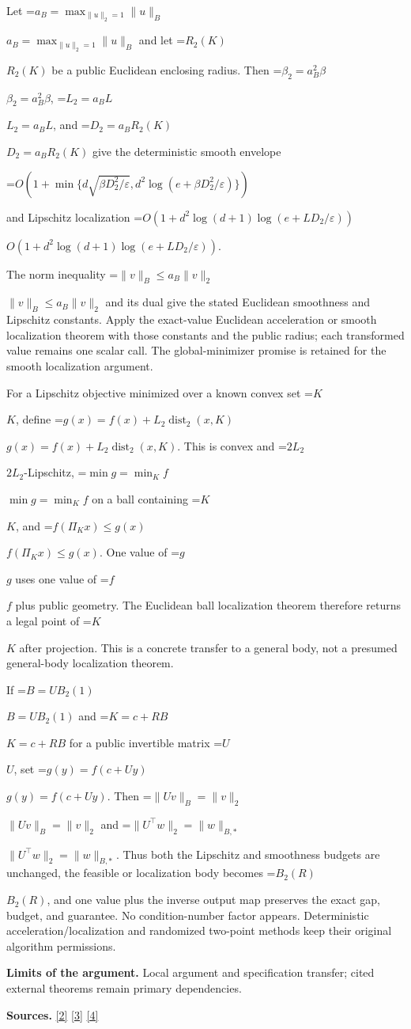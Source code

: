 \documentclass[10pt,a4paper]{article}
\newcommand{\AtlasMath}[1]{\par\begingroup\centering\setbox0=\hbox{$\displaystyle #1$}\ifdim\wd0>1.4\linewidth\typeout{ATLAS WIDE FORMULA: \the\wd0}\fi\ifdim\wd0>\linewidth\resizebox{\linewidth}{!}{\box0}\else\box0\fi\par\endgroup}
\newcommand{\AtlasInlineMath}[1]{\begingroup\setbox0=\hbox{$#1$}\ifdim\wd0>.4\linewidth\endgroup\AtlasMath{#1}\else\endgroup$#1$\fi}
\begin{document}
Let \AtlasInlineMath{a_B=\max_{\|u\|_2=1}\|u\|_B} and let \AtlasInlineMath{R_2(K)} be a public Euclidean enclosing radius. Then \AtlasInlineMath{\beta_2=a_B^2\beta}, \AtlasInlineMath{L_2=a_BL}, and \AtlasInlineMath{D_2=a_BR_2(K)} give the deterministic smooth envelope

\AtlasMath{O\!\left(1+\min\{d\sqrt{\beta D_2^2/\varepsilon},d^2\log(e+\beta D_2^2/\varepsilon)\}\right)}

and Lipschitz localization \AtlasInlineMath{O(1+d^2\log(d+1)\log(e+LD_2/\varepsilon))}.

The norm inequality \AtlasInlineMath{\|v\|_B\le a_B\|v\|_2} and its dual give the stated Euclidean smoothness and Lipschitz constants. Apply the exact-value Euclidean acceleration or smooth localization theorem with those constants and the public radius; each transformed value remains one scalar call. The global-minimizer promise is retained for the smooth localization argument.

For a Lipschitz objective minimized over a known convex set \AtlasInlineMath{K}, define \AtlasInlineMath{g(x)=f(x)+L_2\operatorname{dist}_2(x,K)}. This is convex and \AtlasInlineMath{2L_2}-Lipschitz, \AtlasInlineMath{\min g=\min_K f} on a ball containing \AtlasInlineMath{K}, and \AtlasInlineMath{f(\Pi_Kx)\le g(x)}. One value of \AtlasInlineMath{g} uses one value of \AtlasInlineMath{f} plus public geometry. The Euclidean ball localization theorem therefore returns a legal point of \AtlasInlineMath{K} after projection. This is a concrete transfer to a general body, not a presumed general-body localization theorem.

If \AtlasInlineMath{B=UB_2(1)} and \AtlasInlineMath{K=c+RB} for a public invertible matrix \AtlasInlineMath{U}, set \AtlasInlineMath{g(y)=f(c+Uy)}. Then \AtlasInlineMath{\|Uv\|_B=\|v\|_2} and \AtlasInlineMath{\|U^\top w\|_2=\|w\|_{B,*}}. Thus both the Lipschitz and smoothness budgets are unchanged, the feasible or localization body becomes \AtlasInlineMath{B_2(R)}, and one value plus the inverse output map preserves the exact gap, budget, and guarantee. No condition-number factor appears. Deterministic acceleration/localization and randomized two-point methods keep their original algorithm permissions.

\textbf{Limits of the argument.} Local argument and specification transfer; cited external theorems remain primary dependencies.

\textbf{Sources.} \href{https://arxiv.org/html/2610.00345v1}{[2]} \href{https://arxiv.org/html/2607.16558v2}{[3]} \href{https://www.mathnet.ru/php/archive.phtml?jrnid=mzm&option_lang=eng&paperid=1697&wshow=paper}{[4]}
\end{document}

